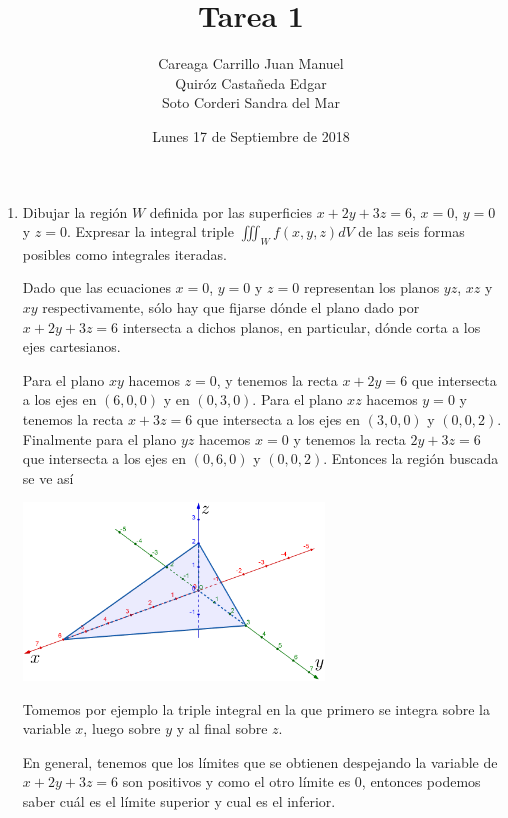 \documentclass{article}
\begin{document}
    \title{Tarea 1}
    \author{Careaga Carrillo Juan Manuel \\ Quiróz Castañeda Edgar \\ Soto Corderi Sandra del Mar}
    \date{Lunes 17 de Septiembre de 2018}
    \maketitle

	\begin{enumerate}
   	\item {
        Dibujar la región $W$ definida por las superficies $x + 2y + 3z = 6$,
        $x = 0$, $y = 0$ y $z = 0$.
        Expresar la integral triple $\iiint_Wf(x,y,z)dV$ de las seis formas posibles
        como integrales iteradas.

        \color{azul}
        Dado que las ecuaciones $x=0$, $y=0$ y $z=0$ representan los planos $yz$, $xz$ y $xy$
        respectivamente, sólo hay que fijarse dónde el plano dado por $x+2y+3z=6$ intersecta a dichos
        planos, en particular, dónde corta a los ejes cartesianos.

        Para el plano $xy$ hacemos $z=0$, y tenemos la recta $x+2y=6$ que intersecta a los ejes en $(6,0,0)$
        y en $(0,3,0)$. Para el plano $xz$ hacemos $y=0$ y tenemos la recta $x+3z=6$ que intersecta a los ejes
        en $(3,0,0)$ y $(0,0,2)$. Finalmente para el plano $yz$ hacemos $x=0$ y tenemos la recta $2y+3z=6$
        que intersecta a los ejes en $(0,6,0)$ y $(0,0,2)$. Entonces la región buscada se ve así
        \begin{center}
            \includegraphics[width=8cm]{img/Ej1_3D.png}
        \end{center}
        Tomemos por ejemplo la triple integral en la que primero se integra sobre la
        variable $x$, luego sobre $y$ y al final sobre $z$.

        En general, tenemos que los límites que se obtienen despejando la
        variable de $x + 2y + 3z = 6$ son positivos y como el otro límite es 0,
        entonces podemos saber cuál es el límite superior y cual es el inferior.

}
\end{enumerate}
\end{document}
